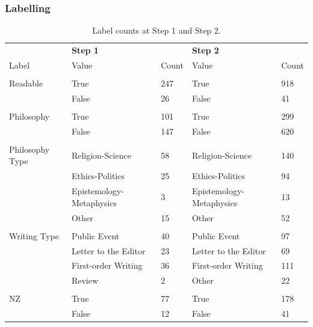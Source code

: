 \documentclass[10pt, compress]{beamer}
\begin{document}
\begin{frame}
	\frametitle{Labelling}

	\begin{table}[]
	        \centering
	        \scriptsize
	        \begin{tabular}{l|ll|ll}
	          & \textbf{Step 1} & & \textbf{Step 2}  & \\
	          Label & Value & Count & Value & Count \\
	          \hline
	          & & & &  \\
	        	Readable & True & 247 & True & 918 \\
	        	& False & 26 & False & 41 \\
	          & & & &  \\
	          Philosophy & True & 101 & True & 299 \\
	          & False & 147 & False & 620 \\
	          & & & &  \\
	          Philosophy Type & Religion-Science & 58 & Religion-Science & 140 \\
	          & Ethics-Politics & 25 &  Ethics-Politics & 94 \\
	          & Epistemology-Metaphysics & 3 & Epistemology-Metaphysics & 13 \\
	          & Other & 15 &  Other & 52 \\
	          & & & &  \\
	          Writing Type & Public Event & 40 & Public Event & 97 \\
	          & Letter to the Editor & 23 &  Letter to the Editor & 69 \\
	          & First-order Writing & 36 &  First-order Writing & 111 \\
	          & Review & 2 &  Other & 22 \\
	          & & & &  \\
	          NZ & True & 77 & True & 178 \\
	          & False & 12 & False & 41 \\
	        \end{tabular}
	        \caption{Label counts at Step 1 and Step 2.}
	        \label{t:labels}
	\end{table}
\end{frame}
\end{document}
